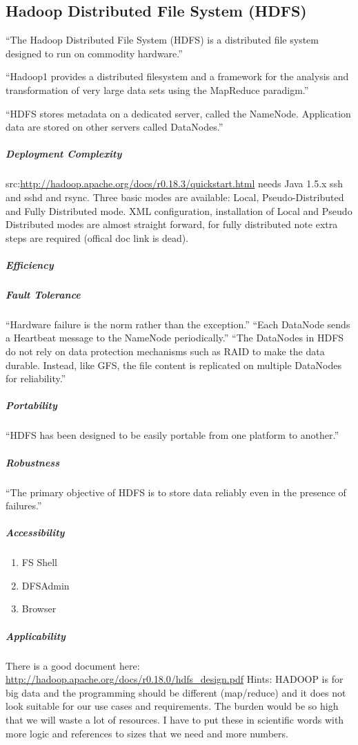 \subsection{Hadoop Distributed File System (HDFS)}
``The Hadoop Distributed File System (HDFS) is a distributed file system designed to run on
commodity hardware.'' \cite[tp.~3]{HDFSDocuments}

``Hadoop1 provides a distributed filesystem and a framework 
for the analysis and transformation of very large data sets 
using the MapReduce \cite{DG04} paradigm.''\cite{TheHDFS}

``HDFS stores metadata on a
dedicated server, called the NameNode. Application data are stored on
other servers called DataNodes.''\cite{TheHDFS}


\subparagraph{Deployment Complexity}
src:\url{http://hadoop.apache.org/docs/r0.18.3/quickstart.html}
needs Java 1.5.x ssh and sshd and rsync. Three basic modes are available:
Local, Pseudo-Distributed and Fully Distributed mode. XML configuration,
installation of Local and Pseudo Distributed modes are almost straight
forward, for fully distributed note extra steps are required (offical
doc link is dead).
\subparagraph{Efficiency}


\subparagraph{Fault Tolerance}
``Hardware failure is the norm rather than the exception.''
``Each DataNode sends a Heartbeat message to the NameNode periodically.''
``The DataNodes in HDFS do not rely on data protection mechanisms 
such as RAID to make the data durable. Instead, like GFS, 
the file content is replicated on multiple DataNodes for reliability.''
\cite{TheHDFS}
\subparagraph{Portability}


``HDFS has been designed to be easily portable from one platform to another.''
\subparagraph{Robustness}

``The primary objective of HDFS is to store data reliably even in the presence of failures.''
\subparagraph{Accessibility}
\begin{enumerate}
\item FS Shell
\item DFSAdmin
\item Browser
\end{enumerate}

\subparagraph{Applicability}
There is a good document here:
\url{http://hadoop.apache.org/docs/r0.18.0/hdfs_design.pdf}
Hints: HADOOP is for big data and the programming should be different (map/reduce)
 and it does not look suitable for our use cases and requirements. The burden would
 be so high that we will waste a lot of resources. I have to put these in scientific
 words with more logic and references to sizes that we need and more numbers.

